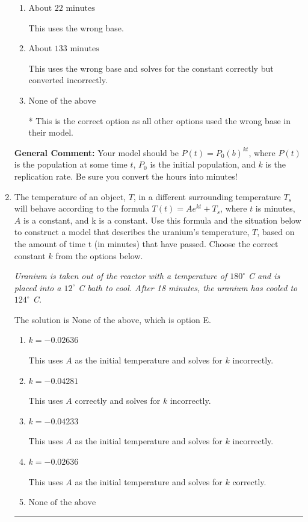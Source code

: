 \documentclass{extbook}[14pt]
\newcommand{\litem}[1]{\item #1

\rule{\textwidth}{0.4pt}}
\begin{document}
\begin{enumerate}
{\begin{enumerate}[label=\Alph*.]
This uses the wrong base, does not solve for the constant correctly, AND converted incorrectly.
\item \( \text{About } 22 \text{ minutes} \)

This uses the wrong base.
\item \( \text{About } 133 \text{ minutes} \)

This uses the wrong base and solves for the constant correctly but converted incorrectly.
\item \( \text{None of the above} \)

* This is the correct option as all other options used the wrong base in their model.
\end{enumerate}

\textbf{General Comment:} Your model should be $P(t) = P_0(b)^{kt}$, where $P(t)$ is the population at some time $t$, $P_0$ is the initial population, and $k$ is the replication rate. Be sure you convert the hours into minutes!
}
\litem{
The temperature of an object, $T$, in a different surrounding temperature $T_s$ will behave according to the formula $T(t) = Ae^{kt} + T_s$, where $t$ is minutes, $A$ is a constant, and k is a constant. Use this formula and the situation below to construct a model that describes the uranium's temperature, $T$, based on the amount of time t (in minutes) that have passed. Choose the correct constant $k$ from the options below.

\begin{center}
    \textit{ Uranium is taken out of the reactor with a temperature of $180^{\circ}$ C and is placed into a $12^{\circ}$ C bath to cool. After 18 minutes, the uranium has cooled to $124^{\circ}$ C. }
\end{center}


The solution is \( \text{None of the above} \), which is option E.\begin{enumerate}[label=\Alph*.]
\item \( k = -0.02636 \)

This uses $A$ as the initial temperature and solves for $k$ incorrectly.
\item \( k = -0.04281 \)

This uses $A$ correctly and solves for $k$ incorrectly.
\item \( k = -0.04233 \)

This uses $A$ as the initial temperature and solves for $k$ incorrectly.
\item \( k = -0.02636 \)

This uses $A$ as the initial temperature and solves for $k$ correctly.
\item \( \text{None of the above} \)


\end{enumerate}}
\end{enumerate}
\end{document}
